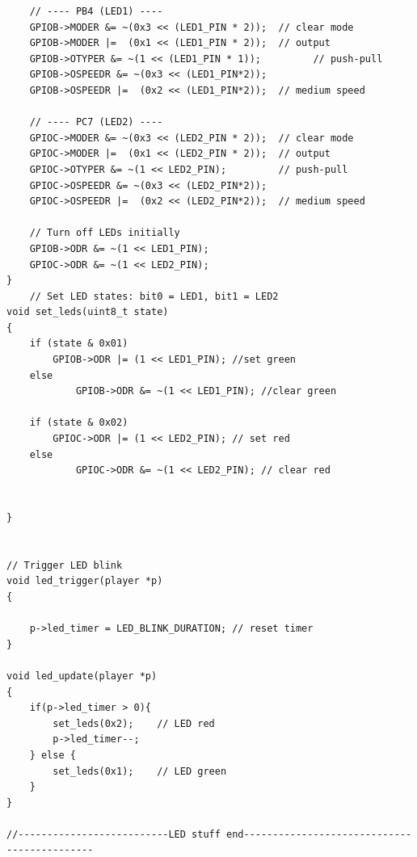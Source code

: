 \begin{lstlisting}
    // ---- PB4 (LED1) ----
    GPIOB->MODER &= ~(0x3 << (LED1_PIN * 2));  // clear mode
    GPIOB->MODER |=  (0x1 << (LED1_PIN * 2));  // output
    GPIOB->OTYPER &= ~(1 << (LED1_PIN * 1));         // push-pull
    GPIOB->OSPEEDR &= ~(0x3 << (LED1_PIN*2));
    GPIOB->OSPEEDR |=  (0x2 << (LED1_PIN*2));  // medium speed

    // ---- PC7 (LED2) ----
    GPIOC->MODER &= ~(0x3 << (LED2_PIN * 2));  // clear mode
    GPIOC->MODER |=  (0x1 << (LED2_PIN * 2));  // output
    GPIOC->OTYPER &= ~(1 << LED2_PIN);         // push-pull
    GPIOC->OSPEEDR &= ~(0x3 << (LED2_PIN*2));
    GPIOC->OSPEEDR |=  (0x2 << (LED2_PIN*2));  // medium speed

    // Turn off LEDs initially
    GPIOB->ODR &= ~(1 << LED1_PIN);
    GPIOC->ODR &= ~(1 << LED2_PIN);
}
	// Set LED states: bit0 = LED1, bit1 = LED2
void set_leds(uint8_t state)
{
    if (state & 0x01)
        GPIOB->ODR |= (1 << LED1_PIN); //set green
	else 
			GPIOB->ODR &= ~(1 << LED1_PIN); //clear green
    
    if (state & 0x02)
        GPIOC->ODR |= (1 << LED2_PIN); // set red
    else
	        GPIOC->ODR &= ~(1 << LED2_PIN); // clear red


}


// Trigger LED blink
void led_trigger(player *p)
{	

    p->led_timer = LED_BLINK_DURATION; // reset timer
}

void led_update(player *p)
{
    if(p->led_timer > 0){
		set_leds(0x2);    // LED red
        p->led_timer--;
    } else {
        set_leds(0x1);    // LED green
    }
}

//--------------------------LED stuff end--------------------------------------------

\end{lstlisting}

